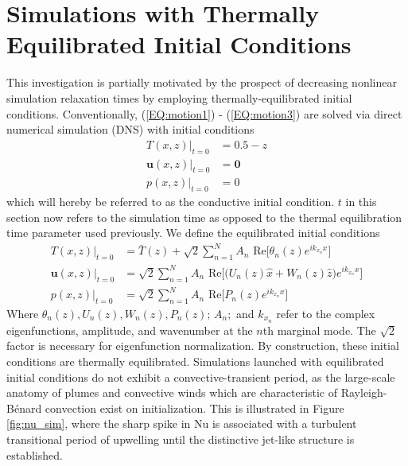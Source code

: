 \documentclass[reprint,amsmath,amssymb,aps]{revtex4-1}
\newcommand\Nu{\mathrm{Nu}}
\begin{document}
\section{Simulations with Thermally Equilibrated Initial Conditions}
This investigation is partially motivated by the prospect of decreasing nonlinear simulation relaxation times by employing thermally-equilibrated initial conditions. Conventionally, (\ref{EQ:motion1}) - (\ref{EQ:motion3}) are solved via direct numerical simulation (DNS) with initial conditions
\begin{align}
    T(x, z)\big|_{t=0} &= 0.5 - z \\
    \mathbf{u}(x, z)\big|_{t=0} &= \mathbf{0} \\
    p(x, z)\big|_{t=0} &= 0
\end{align}
which will hereby be referred to as the conductive initial condition. $t$ in this section now refers to the simulation time as opposed to the thermal equilibration time parameter used previously. We define the equilibrated initial conditions
\begin{align}
    T(x, z)\big|_{t=0} &= \bar{T}(z) + \sqrt{2} \sum_{n=1}^N  A_n \text{ Re} \Big[ \theta_n(z) e^{ik_{x_n}x} \Big] \nonumber \\
    \mathbf{u}(x, z)\big|_{t=0} &= \sqrt{2} \sum_{n=1}^N A_n \text{ Re} \Big[\Big( U_n (z) \hat{x} + W_n(z) \hat{z} \Big) e^{ik_{x_n}x} \Big] \nonumber\\
    p(x, z)\big|_{t=0} &= \sqrt{2} \sum_{n=1}^N A_n \text{ Re} \Big[P_n (z) e^{ik_{x_n}x}\Big]
\end{align}
Where $\theta_n(z), U_n(z), W_n(z), P_n(z); \, A_n; $ and $k_{x_n}$ refer to the complex eigenfunctions, amplitude, and wavenumber at the $n$th marginal mode. The $\sqrt{2}$ factor is necessary for eigenfunction normalization. By construction, these initial conditions are thermally equilibrated. 
Simulations launched with equilibrated initial conditions do not exhibit a convective-transient period, as the large-scale anatomy of plumes and convective winds which are characteristic of Rayleigh-B\'enard convection exist on initialization. This is illustrated in Figure \ref{fig:nu_sim}, where the sharp spike in $\Nu$ is associated with a turbulent transitional period of upwelling until the distinctive jet-like structure is established. 
\end{document}
